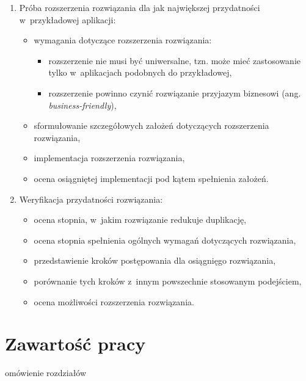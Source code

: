 \begin{enumerate}
 \item Próba rozszerzenia rozwiązania dla jak największej przydatności w~przykładowej aplikacji:
  \begin{itemize}
   \item wymagania dotyczące rozszerzenia rozwiązania:
    \begin{itemize}
     \item rozszerzenie nie musi być uniwersalne, tzn. może mieć zastosowanie tylko w~aplikacjach podobnych do przykładowej,
     \item rozszerzenie powinno czynić rozwiązanie przyjazym biznesowi (ang. \emph{business-friendly}),
    \end{itemize}
   \item sformułowanie szczegółowych założeń dotyczących rozszerzenia rozwiązania,
   \item implementacja rozszerzenia rozwiązania,
   \item ocena osiągniętej implementacji pod kątem spełnienia założeń.
  \end{itemize}
  
 \item Weryfikacja przydatności rozwiązania:
  \begin{itemize}
   \item ocena stopnia, w~jakim rozwiązanie redukuje duplikację,
   \item ocena stopnia spełnienia ogólnych wymagań dotyczących rozwiązania,
   \item przedstawienie kroków postępowania dla osiągnięgo rozwiązania,
   \item porównanie tych kroków z~innym powszechnie stosowanym podejściem,
   \item ocena możliwości rozszerzenia rozwiązania.
  \end{itemize}

\end{enumerate}



\section{Zawartość pracy}
omówienie rozdziałów
